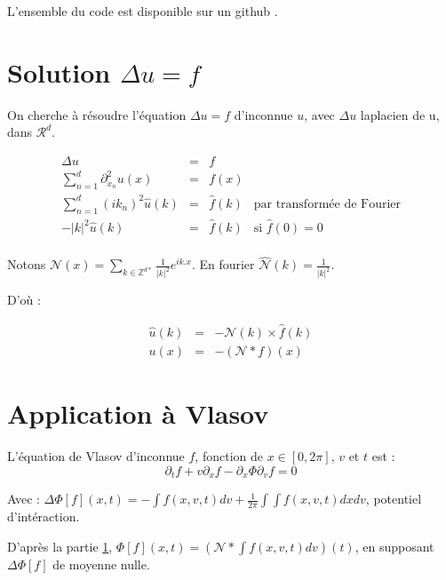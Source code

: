 \documentclass[a4paper,11pt]{article}
\begin{document}
L'ensemble du code est disponible sur un github . 

\section{Solution $\Delta u = f$}
\label{delta u}

On cherche à résoudre l'équation $\Delta u = f$ d'inconnue $u$, avec $\Delta u$ laplacien de u, dans $\mathcal{R}^d$.

$$
\begin{array}{rclr}

\Delta u &=& f \\

\sum\limits_{n=1}^d {\partial^2_ {x_n}} u(x) &=& f(x) \\

\sum\limits_{n=1}^d (ik_n)^2 \widehat{u}(k) &=& \widehat{f}(k) & \text{par transformée de Fourier} \\

-|k|^2  \widehat{u}(k) &=& \widehat{f}(k) & \text{si } \widehat{f}(0)=0 \\

\end{array}
$$

Notons $\mathcal{N} (x) = \sum\limits _{k \in \mathbb{Z}^{d*}} \frac{1}{|k|^2} e^{ik.x}$. En fourier $\widehat{\mathcal{N}}(k) = \frac{1}{|k|^2}$.

D'où :

$$
\begin{array}{rclr}

\widehat{u} (k) &=& - \mathcal{N}(k) \times \widehat{f} (k) \\

u(x) &=& - (\mathcal{N} \ast f) (x)

\end{array}
$$

\section{Application à Vlasov}

L'équation de Vlasov d'inconnue $f$, fonction de $x \in [0, 2 \pi]$, $v$ et $t$ est :
$$
\partial_t f + v \partial_x f - \partial_ x \Phi \partial_v f = 0
$$

Avec : $\Delta \Phi [f](x,t) =  - \int f(x,v,t) dv +  \frac{1}{2 \pi} \int \int f(x, v , t) dx dv$, potentiel d'intéraction.

D'après la partie \ref{delta u}, $\Phi[f](x,t) = (\mathcal{N} \ast \int f(x,v,t)dv) (t)$, en supposant $\Delta \Phi [f]$ de moyenne nulle.
\end{document}
